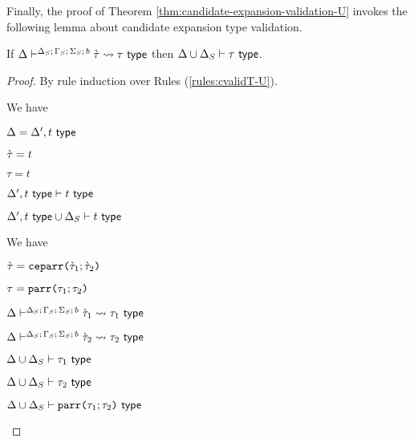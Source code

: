 Finally, the proof of Theorem \ref{thm:candidate-expansion-validation-U} invokes the following lemma about candidate expansion type validation.
\begin{lemma}\label{lemma:candidate-expansion-type-validation}
If $\Delta\vdash^{\Delta_S;\,\Gamma_S;\,\Sigma_S;\,b} \grave{\tau} \leadsto \tau~\mathsf{type}$ then ${\Delta}\cup{\Delta_S} \vdash \tau~\mathsf{type}$.
\end{lemma}
\begin{proof} By rule induction over Rules (\ref{rules:cvalidT-U}).
\begin{byCases}
\item[\text{(\ref{rule:cvalidT-U-tvar})}] We have 
\begin{pfsteps*}
   \item $\Delta=\Delta', t~\mathsf{type}$ 
   \item $\grave{\tau}=t$ 
   \item $\tau=t$ 
   \item $\Delta', t~\mathsf{type} \vdash t~\mathsf{type}$  
   \item ${\Delta', t~\mathsf{type}}\cup{\Delta_S} \vdash t~\mathsf{type}$ 
 \end{pfsteps*} 
\resetpfcounter

\item[\text{(\ref{rule:cvalidT-U-parr})}] We have
\begin{pfsteps*}
  \item $\grave{\tau}=\texttt{ceparr}\texttt{(}\grave{\tau}_1; \grave{\tau}_2\texttt{)}$ 
  \item $\tau=\texttt{parr}\texttt{(}\tau_1; \tau_2\texttt{)}$ 
  \item $\Delta\vdash^{\Delta_S;\,\Gamma_S;\,\Sigma_S;\,b} \grave{\tau}_1 \leadsto \tau_1~\mathsf{type}$  
  \item $\Delta\vdash^{\Delta_S;\,\Gamma_S;\,\Sigma_S;\,b} \grave{\tau}_2 \leadsto \tau_2~\mathsf{type}$  
  \item ${\Delta}\cup{\Delta_S} \vdash \tau_1~\mathsf{type}$  
  \item ${\Delta}\cup{\Delta_S} \vdash \tau_2~\mathsf{type}$  
  \item ${\Delta}\cup{\Delta_S} \vdash \texttt{parr}\texttt{(}\tau_1; \tau_2\texttt{)}~\mathsf{type}$ 
\end{pfsteps*}
\resetpfcounter


\end{byCases}
\end{proof}
